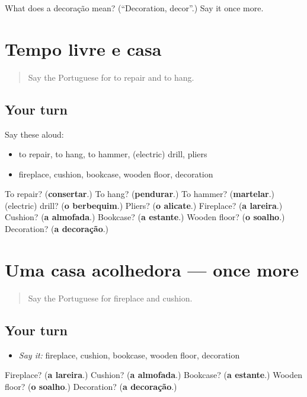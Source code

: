 \begin{tcolorbox}[breakable,colback=teal!4,colframe=teal!35!black,title={Before you move on}]
What does a decoração mean? (\textquotedblleft{}Decoration, decor\textquotedblright{}.) Say it once more.
\end{tcolorbox}
\section[(dialogue)]{Tempo livre e casa}

\label{lesson:PT-R532-revisao-531-532}



\begin{quote}
Say the Portuguese for to repair and to hang.
\end{quote}

\subsection*{Your turn}
Say these aloud:

\begin{itemize}
\raggedright
  \item to repair, to hang, to hammer, (electric) drill, pliers
  \item fireplace, cushion, bookcase, wooden floor, decoration
\end{itemize}

\begin{tcolorbox}[breakable,colback=teal!4,colframe=teal!35!black,title={Before you move on}]
To repair? (\textbf{consertar}.) To hang? (\textbf{pendurar}.) To hammer? (\textbf{martelar}.) (electric) drill? (\textbf{o berbequim}.) Pliers? (\textbf{o alicate}.) Fireplace? (\textbf{a lareira}.) Cushion? (\textbf{a almofada}.) Bookcase? (\textbf{a estante}.) Wooden floor? (\textbf{o soalho}.) Decoration? (\textbf{a decoração}.)
\end{tcolorbox}
\section[(dialogue)]{Uma casa acolhedora — once more}

\label{lesson:PT-R532-revisao-final-532}



\begin{quote}
Say the Portuguese for fireplace and cushion.
\end{quote}

\subsection*{Your turn}
\begin{itemize}
\raggedright
  \item \emph{Say it:} fireplace, cushion, bookcase, wooden floor, decoration
\end{itemize}

\begin{tcolorbox}[breakable,colback=teal!4,colframe=teal!35!black,title={Before you move on}]
Fireplace? (\textbf{a lareira}.) Cushion? (\textbf{a almofada}.) Bookcase? (\textbf{a estante}.) Wooden floor? (\textbf{o soalho}.) Decoration? (\textbf{a decoração}.)
\end{tcolorbox}
